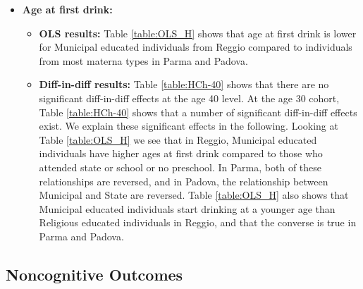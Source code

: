 \documentclass[11pt]{article}
\begin{document}
\begin{itemize}
\item \textbf{Age at first drink:} 
	
	\begin{itemize}
	\item \textbf{OLS results:} Table  \ref{table:OLS_H} shows that age at first drink is lower for Municipal educated individuals from Reggio compared to individuals from most materna types in Parma and Padova.
	
	\item \textbf{Diff-in-diff results:} Table \ref{table:HCh-40} shows that there are no significant diff-in-diff effects at the age 40 level. At the age 30 cohort, Table \ref{table:HCh-40} shows that a number of significant diff-in-diff effects exist. We explain these significant effects in the following. Looking at Table \ref{table:OLS_H} we see that in Reggio, Municipal educated individuals have higher ages at first drink compared to those who attended state or school or no preschool. In Parma, both of these relationships are reversed, and in Padova, the relationship between Municipal and State are reversed. Table \ref{table:OLS_H} also shows that Municipal educated individuals start drinking at a younger age than Religious educated individuals in Reggio, and that the converse is true in Parma and Padova.
	\end{itemize}
\end{itemize}

\subsection{Noncognitive Outcomes}
\end{document}

